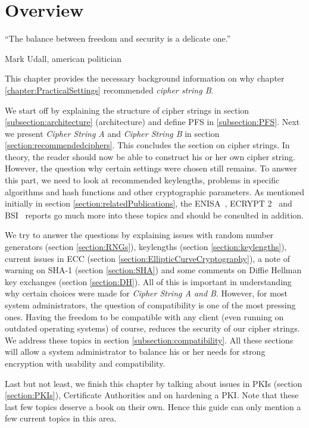 \section{Overview}
\label{sec:TheoryOverview}


\epigraph{``The balance between freedom and security is a delicate one.''}{Mark Udall, american politician}

This chapter provides the necessary background information on why chapter \ref{chapter:PracticalSettings} recommended \textit{cipher string B}.

We start off by explaining the structure of cipher strings in section \ref{subsection:architecture} (architecture) and define \ac{PFS} in \ref{subsection:PFS}. Next we present \textit{Cipher String A} and \textit{Cipher String B} in section \ref{section:recommendedciphers}. This concludes the section on cipher strings. In theory, the reader should now be able to construct his or her own cipher string. However, the question why certain settings were chosen still remains. To answer this part, we need to look at recommended keylengths, problems in specific algorithms and hash functions and other cryptographic parameters. As mentioned initially in section \ref{section:relatedPublications}, the ENISA~\cite{ENISA2013}, ECRYPT 2~\cite{ii2011ecrypt} and BSI~\cite{TR02102} reports go much more into these topics and should be consulted in addition.

We try to answer the questions by explaining issues with random number generators (section \ref{section:RNGs}), keylengths (section \ref{section:keylengths}), current issues in ECC (section \ref{section:EllipticCurveCryptography}), a note of warning on SHA-1 (section \ref{section:SHA}) and some comments on Diffie Hellman key exchanges (section \ref{section:DH}). All of this is important in understanding why certain choices were made for \textit{Cipher String A and B}. However, for most system administrators, the question of compatibility is one of the most pressing ones.  Having the freedom to be compatible with any client (even running on outdated operating systems) of course, reduces the security of our cipher strings. We address these topics in section \ref{subsection:compatibility}. All these sections will allow a system administrator to balance his or her needs for strong encryption with usability and compatibility.

Last but not least, we finish this chapter by talking about issues in PKIs (section \ref{section:PKIs}), Certificate Authorities and on hardening a PKI.  Note that these last few topics deserve a book on their own. Hence this guide can only mention a few current topics in this area.

